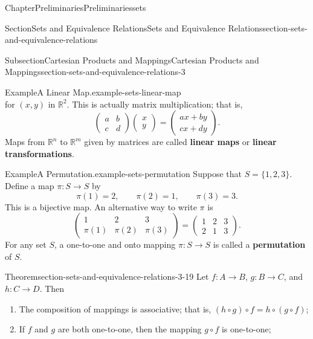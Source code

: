 \documentclass[oneside,10pt,]{book}
\newcommand{\terminology}[1]{\textbf{#1}}
\numberwithin{equation}{section}
\begin{document}
\begin{chapterptx}{Chapter}{Preliminaries}{}{Preliminaries}{}{}{sets}
\begin{sectionptx}{Section}{Sets and Equivalence Relations}{}{Sets and Equivalence Relations}{}{}{section-sets-and-equivalence-relations}
\begin{subsectionptx}{Subsection}{Cartesian Products and Mappings}{}{Cartesian Products and Mappings}{}{}{section-sets-and-equivalence-relations-3}
\begin{example}{Example}{A Linear Map.}{example-sets-linear-map}
\begin{equation*}
\end{equation*}
for \((x,y)\) in \({\mathbb R}^2\).  This is actually matrix multiplication; that is,%
\begin{equation*}
\begin{pmatrix}
a & b \\
c & d
\end{pmatrix}
\begin{pmatrix}
x \\ y
\end{pmatrix}
=
\begin{pmatrix}
ax + by \\
cx +dy
\end{pmatrix}\text{.}
\end{equation*}
Maps from \({\mathbb R}^n\) to \({\mathbb R}^m\) given by matrices are called \terminology{linear maps} or \terminology{linear transformations}.%
\end{example}
\begin{example}{Example}{A Permutation.}{example-sets-permutation}%
Suppose that \(S = \{ 1,2,3  \}\). Define a map \(\pi :S\rightarrow S\) by%
\begin{equation*}
\pi( 1 )  = 2, \qquad \pi( 2 )  = 1, \qquad \pi( 3 )  = 3\text{.}
\end{equation*}
This is a bijective map.  An alternative way to  write \(\pi\) is%
\begin{equation*}
\begin{pmatrix}
1 & 2 & 3 \\
\pi(1) & \pi(2) & \pi(3)
\end{pmatrix}
=
\begin{pmatrix}
1 & 2 & 3 \\
2 & 1 & 3
\end{pmatrix}\text{.}
\end{equation*}
For any set \(S\), a one-to-one and onto mapping \(\pi : S \rightarrow S\) is called a \terminology{permutation} of \(S\).%
\end{example}
\begin{theorem}{Theorem}{}{}{section-sets-and-equivalence-relations-3-19}%
Let \(f : A \rightarrow B\), \(g : B \rightarrow C\), and \(h : C \rightarrow D\). Then%
\begin{enumerate}
\item{}The composition of mappings is associative; that is, \((h \circ g) \circ f = h \circ (g \circ f)\);%
\item{}If \(f\) and \(g\) are both one-to-one, then the mapping \(g \circ f\) is one-to-one;%

\end{enumerate}
\end{theorem}
\end{subsectionptx}
\end{sectionptx}
\end{chapterptx}
\end{document}

